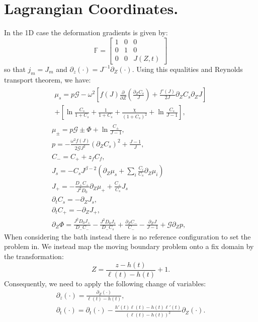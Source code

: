 \documentclass[12pt]{extarticle}
\newcommand{\F}{\ensuremath{\mathbb{F}}}
\begin{document}
\section{Lagrangian Coordinates.}
In the 1D case the deformation gradients is given by:
\begin{equation}
\F=\begin{bmatrix}
1 & 0&0\\
0 & 1 & 0 \\
0 & 0 & J(Z,t)
\end{bmatrix}
\end{equation}
so that $j_m=J_m$ and $\partial_z(\cdot)=J^{-1}\partial_Z(\cdot)$. Using this equalities and Reynolds transport theorem, we have:
\begin{gather}
\begin{aligned}
\mu_s = p \mathcal{G}  - \omega^2\left[f(J)\frac{\partial}{\partial Z} \left(\frac{\partial_ZC_s}{J}\right)+\frac{f'(J)}{2J}\partial_Z C_s\partial_Z J\right]\\
+ \left[\ln \frac{C_s}{1+C_s} + \frac{1}{1+C_s}+\frac{\chi}{(1+C_s)^2} + \ln \frac{C_s}{J-1} \right], 
\end{aligned}\\[2.5mm]
\mu_\pm = p \mathcal{G} \pm \Phi + \ln \frac{C_\pm}{J-1} ,\\
p=-\frac{\omega^2 f(J)}{2\mathcal{G}J^2} (\partial_Z C_s)^2+ \frac{J-1}{J},\\
C_- = C_+ + z_f C_f,\\
J_s =-C_s J^{\beta-2}  \left(\partial_Z\mu_s +\sum_i \frac{C_i}{C_s} \partial_Z \mu_i\right)\\
J_+= - \frac{D_+ C_+}{J^2D_0}\partial_Z \mu_+ + \frac{C_+}{C_s}J_s\\
\partial_t C_s =- \partial_Z J_s,\\
\partial_t C_+ = -\partial_Z J_+,\\
\partial_Z \Phi = \frac{J^2 D_0 J_+}{D_-C_-}- \frac{J^2 D_0 J_s}{D_-C_s}+ \frac{\partial_Z C_-}{C_-}-\frac{\partial_Z J}{J-1}+\mathcal{G}\partial_Z p,
\end{gather}
When considering the bath instead there is no reference configuration to set the problem in. We instead map the moving boundary problem onto a fix domain by the transformation:
\begin{equation}
Z= \frac{z-h(t)}{\ell(t)-h(t)}+1.
\end{equation}
Consequently, we need to apply the following change of variables:
\begin{eqnarray}
\partial_z(\cdot) = \frac{\partial_Z (\cdot)}{\ell(t)-h(t)},\\
\partial_t(\cdot) = \partial_t (\cdot) - \frac{h'(t)\ell(t)-h(t)\ell'(t)}{(\ell(t)-h(t))^2}\partial_Z(\cdot).
\end{eqnarray}
\end{document}
